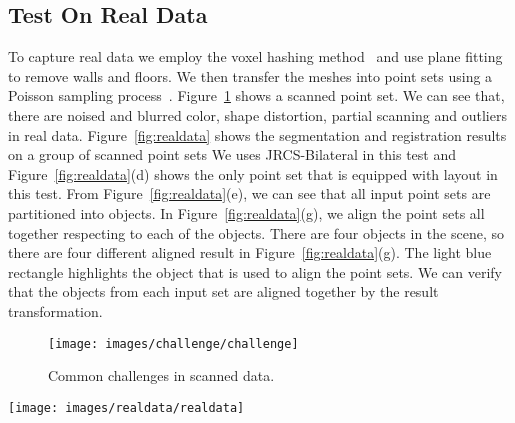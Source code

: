 \subsection{Test On Real Data}
To capture real data we employ the voxel hashing method~\cite{VXH} and use plane fitting to remove walls and floors. 
%
We then transfer the meshes into point sets using a Poisson sampling process~\cite{PossionSampling}.
%
Figure~\ref{fig:challenge} shows a scanned point set. We can see that, there are noised and blurred color, shape distortion, partial scanning and outliers in real data.
%
Figure~\ref{fig:realdata} shows the segmentation and registration results on a group of scanned point sets We uses JRCS-Bilateral in this test and Figure~\ref{fig:realdata}(d) shows the only point set that is equipped with layout in this test.
From Figure~\ref{fig:realdata}(e), we can see that all input point sets are partitioned into objects. In Figure~\ref{fig:realdata}(g), we align the point sets all together respecting to each of the objects. There are four objects in the scene, so there are four different aligned result in Figure~\ref{fig:realdata}(g). The light blue rectangle highlights the object that is used to align the point sets. We can verify that the objects from each input set are aligned together by the result transformation.
\begin{figure}
	\centering
	\texttt{[image: images/challenge/challenge]}
	\caption{\label{fig:challenge}Common challenges in scanned data.}
\end{figure}
\begin{figure*}
	\centering
	\texttt{[image: images/realdata/realdata]}
	\caption{\label{fig:realdata} Segmentation and registration on real data. (a) Scanned mesh using method in \cite{VXH}. (b) Remove walls and floors by plane fitting. (c) Sampled point set using \cite{PossionSampling}. (d) With roughly placed boxes on only one point set, the points are initially segmented in this one point set. Note that parts of the chair legs are segmented to the table due to the rough box placement by users. (e) Pairs of input point sets and corresponding segmentation results. (f) The final Gaussian centroids for the five objects in the scene. (g) Verification of the registration result by aligning all point sets with respect to each object. The light blue rectangle highlights the object that is aligned together. Except the aligned object, the other objects are placed quite messy since they came from different point sets and have different arrangement relative to the aligned object. %
	}
\end{figure*} 
